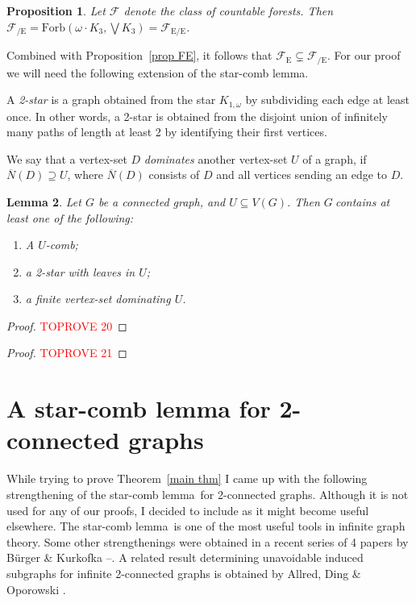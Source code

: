 \documentclass{article}
\newcommand{\forb}[1]{\mathrm{Forb}(#1)}
\newcommand{\frs}{\mathcal{F}}
\newcommand{\frsE}{\frs_\mathrm{E}}
\newcommand{\frsCE}{\frs_\mathrm{{/E}}}
\newcommand{\rmece}[1]{\ensuremath{#1_{\mathrm{E/E}}}}
\newcommand{\omdot}{\omega \cdot}
\newcommand{\defi}[1]{{\color{darkgray}\emph{#1}}}
\newtheorem{proposition}{Proposition}[section]
\newtheorem{lemma}[proposition]{Lemma}
\newcommand{\cls}[1]{\ensuremath{\overline{#1}}}
\newcommand{\g}{\ensuremath{G\ }}
\newcommand{\Tr}[1]{Theorem~\ref{#1}}
\newcommand{\Prr}[1]{Pro\-position~\ref{#1}}
\newcommand{\scl}{star-comb lemma}
\begin{document}
\begin{proposition} \label{prop FCE}
Let $\frs$ denote the class of countable forests. Then $\frsCE= \forb{\omdot K_3, \bigvee K_3} = \rmece{\frs}$.
\end{proposition}
Combined with \Prr{prop FE}, it follows that $\frsE \subsetneq \frsCE$. For our proof we will need the following extension of the star-comb lemma.

A \defi{2-star} is a graph obtained from the star $K_{1,\omega}$ by subdividing each edge at least once. In other words, a 2-star is obtained from the disjoint union of infinitely many paths of length at least 2 by identifying their first vertices.

We say that a vertex-set $D$ \defi{dominates} another vertex-set $U$ of a graph, if $\cls{N}(D) \supseteq U$, where  $\cls{N}(D)$ consists of $D$ and all vertices sending an edge to $D$.

\begin{lemma} \label{2star comb}
Let $G$ be a connected graph, and $U\subseteq V(G)$. Then \g contains at least one of the following:
\begin{enumerate}
	\item \label{SC i} A $U$-comb;
	\item \label{SC ii} a 2-star with leaves in $U$;
	\item \label{SC iii} a finite vertex-set dominating $U$.
\end{enumerate}
\end{lemma}
\begin{proof}\textcolor{red}{TOPROVE 20}\end{proof}



\begin{proof}\textcolor{red}{TOPROVE 21}\end{proof}

\section{A star-comb lemma for 2-connected graphs} \label{sec SC}

While trying to prove \Tr{main thm} I came up with the following strengthening of the \scl\ for 2-connected graphs. Although it is not used for any of our proofs, I decided to include as it might become useful elsewhere. The \scl\ is one of the most useful tools in infinite graph theory. Some other strengthenings were obtained in a recent series of 4 papers by B\"urger \& Kurkofka \cite{BurKurDuaI}--\cite{BurKurDuaIV}. A related result determining unavoidable induced subgraphs for infinite 2-connected graphs is obtained by Allred, Ding \& Oporowski \cite{AlDiOpUna}. 
\end{document}
